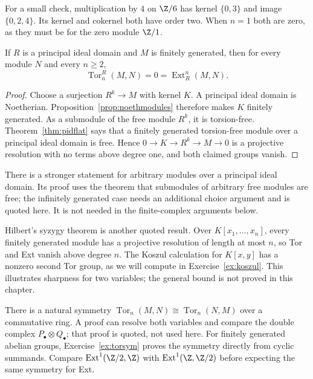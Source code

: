 For a small check, multiplication by $4$ on $\Z/6$ has kernel $\{0,3\}$ and image $\{0,2,4\}$. Its kernel and cokernel both have order two. When $n=1$ both are zero, as they must be for the zero module $\Z/1$.

\begin{proposition}\label{prop:pidvanish}
If $R$ is a principal ideal domain and $M$ is finitely generated, then for every module $N$ and every $n\ge2$,
\[
\operatorname{Tor}_n^R(M,N)=0=\operatorname{Ext}^n_R(M,N).
\]
\end{proposition}

\begin{proof}
Choose a surjection $R^k\to M$ with kernel $K$. A principal ideal domain is Noetherian. Proposition~\ref{prop:noethmodules} therefore makes $K$ finitely generated. As a submodule of the free module $R^k$, it is torsion-free. Theorem~\ref{thm:pidflat} says that a finitely generated torsion-free module over a principal ideal domain is free. Hence
$0\to K\to R^k\to M\to0$ is a projective resolution with no terms above degree one, and both claimed groups vanish.
\end{proof}

There is a stronger statement for arbitrary modules over a principal ideal domain. Its proof uses the theorem that submodules of arbitrary free modules are free; the infinitely generated case needs an additional choice argument and is quoted here. It is not needed in the finite-complex arguments below.

Hilbert's syzygy theorem is another quoted result. Over $K[x_1,\ldots,x_n]$, every finitely generated module has a projective resolution of length at most $n$, so Tor and Ext vanish above degree $n$. The Koszul calculation for $K[x,y]$ has a nonzero second Tor group, as we will compute in Exercise~\ref{ex:koszul}. This illustrates sharpness for two variables; the general bound is not proved in this chapter.

\begin{think}
There is a natural symmetry
$\operatorname{Tor}_n(M,N)\cong\operatorname{Tor}_n(N,M)$ over a commutative ring. A proof can resolve both variables and compare the double complex $P_\bullet\otimes Q_\bullet$; that proof is quoted, not used here. For finitely generated abelian groups, Exercise~\ref{ex:torsym} proves the symmetry directly from cyclic summands. Compare $\operatorname{Ext}^1(\Z/2,\Z)$ with $\operatorname{Ext}^1(\Z,\Z/2)$ before expecting the same symmetry for Ext.
\end{think}

